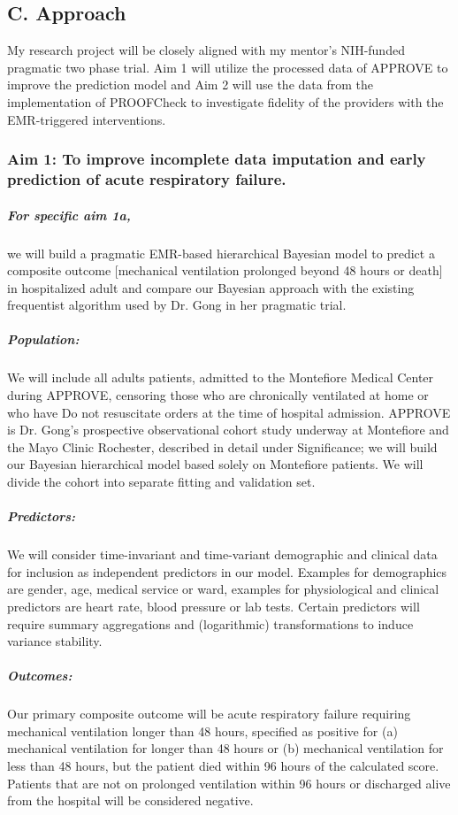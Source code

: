 \documentclass[11pt,notitlepage]{article}
\begin{document}
\subsection*{C. Approach}
My research project will be closely aligned with my mentor's NIH-funded pragmatic two phase trial. Aim 1 will utilize the processed data of APPROVE to improve the prediction model and Aim 2 will use the data from the implementation of PROOFCheck to investigate fidelity of the providers with the EMR-triggered interventions.

\subsubsection*{Aim 1: To improve incomplete data imputation and early prediction of acute respiratory failure.}


\subparagraph*{For specific aim 1a,} we will build a pragmatic EMR-based hierarchical Bayesian model to predict a composite outcome [mechanical ventilation prolonged beyond 48 hours or death] in hospitalized adult and compare our Bayesian approach with the existing frequentist algorithm used by Dr. Gong in her pragmatic trial.

\subparagraph*{Population:}
We will include all adults patients, admitted to the Montefiore Medical Center during APPROVE, censoring those who are chronically ventilated at home or who have Do not resuscitate orders at the time of hospital admission. APPROVE is Dr. Gong's prospective observational cohort study underway at Montefiore and the Mayo Clinic Rochester, described in detail under Significance; we will build our Bayesian hierarchical model based solely on Montefiore patients. We will divide the cohort into separate fitting and validation set.

\subparagraph*{Predictors:}
We will consider time-invariant and time-variant demographic and clinical data for inclusion as independent predictors in our model. Examples for demographics are gender, age, medical service or ward, examples for physiological and clinical predictors are heart rate, blood pressure or lab tests. Certain predictors will require summary aggregations and (logarithmic) transformations to induce variance stability.

\subparagraph*{Outcomes:}
Our primary composite outcome will be acute respiratory failure requiring mechanical ventilation longer than 48 hours, specified as positive for (a) mechanical ventilation for longer than 48 hours or (b) mechanical ventilation for less than 48 hours, but the patient died within 96 hours of the calculated score. Patients that are not on prolonged ventilation within 96 hours or discharged alive from the hospital will be considered negative.
\end{document}

